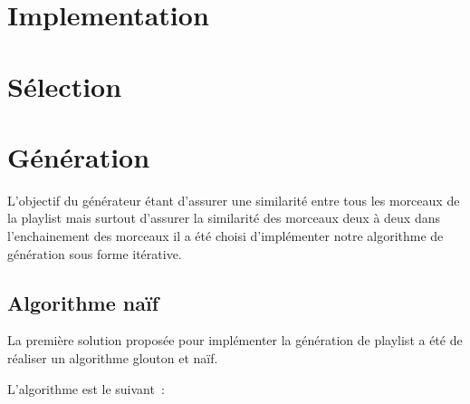 \section{Implementation}
\label{impl:general}

\section{Sélection}
\label{impl:selection}

\section{Génération}
\label{impl:generation}

L'objectif du générateur étant d'assurer une similarité entre tous les morceaux de la playlist mais surtout d'assurer la similarité des morceaux deux à deux dans l'enchainement des morceaux il a été choisi d'implémenter notre algorithme de génération sous forme itérative.

\subsection{Algorithme naïf}
\label{impl:selection:naif}

La première solution proposée pour implémenter la génération de playlist a été de réaliser un algorithme glouton et naïf.\newline

L'algorithme est le suivant~:

